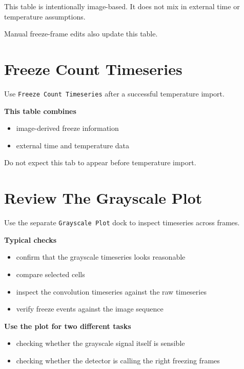 \documentclass[
  9pt,
  letterpaper,
  oneside,
  open=any,
  DIV=15,
  parskip=half-,
  headings=big,
  numbers=noenddot
]{scrbook}
\newcommand{\manuallead}[1]{%
  \vspace{0.15em}%
  {\sffamily\bfseries\color{ManualBlue}#1}\par\nobreak\vspace{0.05em}%
}
\begin{document}
This table is intentionally image-based. It does not mix in external time or temperature assumptions.


Manual freeze-frame edits also update this table.


\section{Freeze Count Timeseries}

Use \texttt{Freeze Count Timeseries} after a successful temperature import.


\manuallead{This table combines}

\begin{itemize}[leftmargin=*,itemsep=0.35em,topsep=0.4em]
\item image-derived freeze information
\item external time and temperature data
\end{itemize}

Do not expect this tab to appear before temperature import.


\section{Review The Grayscale Plot}

Use the separate \texttt{Grayscale Plot} dock to inspect timeseries across frames.


\manuallead{Typical checks}

\begin{itemize}[leftmargin=*,itemsep=0.35em,topsep=0.4em]
\item confirm that the grayscale timeseries looks reasonable
\item compare selected cells
\item inspect the convolution timeseries against the raw timeseries
\item verify freeze events against the image sequence
\end{itemize}

\manuallead{Use the plot for two different tasks}

\begin{itemize}[leftmargin=*,itemsep=0.35em,topsep=0.4em]
\item checking whether the grayscale signal itself is sensible
\item checking whether the detector is calling the right freezing frames
\end{itemize}
\end{document}

